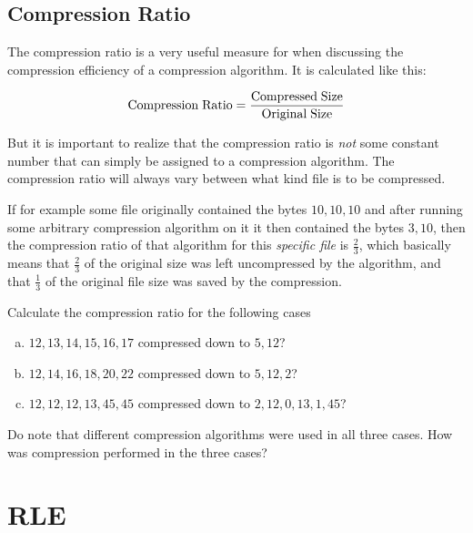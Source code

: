 \subsection{Compression Ratio}

The compression ratio is a very useful
measure for when discussing the compression efficiency of a
compression algorithm. It is calculated like this:

\begin{equation*}
  {\rm Compression\;Ratio} = \frac{{\rm Compressed\; Size}}{{\rm Original\; Size}}
\end{equation*}

But it is important to realize that the compression ratio is
\textit{not} some constant number that can simply be assigned to a
compression algorithm. The compression ratio will always vary between
what kind file is to be compressed.

If for example some file originally contained the bytes $10,10,10$ and
after running some arbitrary compression algorithm on it it then
contained the bytes $3,10$, then the compression ratio of that
algorithm for this \textit{specific file} is $\frac{2}{3}$, which
basically means that $\frac{2}{3}$ of the original size was left
uncompressed by the algorithm, and that $\frac{1}{3}$ of the original
file size was saved by the compression.

\begin{Exercise}[label={compression-ratio}]

  Calculate the compression ratio for the following cases

  \begin{enumerate}[(a)]
  \item $12,13,14,15,16,17$ compressed down to $5,12$?
  \item $12,14,16,18,20,22$ compressed down to $5,12,2$?
  \item $12,12,12,13,45,45$ compressed down to $2,12,0,13,1,45$?
  \end{enumerate}

  Do note that different compression algorithms were used in all three
  cases. How was compression performed in the three cases?

\end{Exercise}

\section{RLE}
\label{sec:rle}


